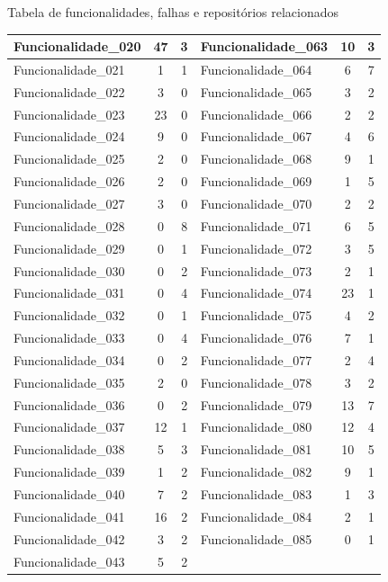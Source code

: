 \documentclass[11.5pt]{article}
\begin{document}
\begin{apendice}{Tabela de funcionalidades, falhas e repositórios relacionados}
\begin{table}[ht]
\begin{tabular}{|l|c|c||l|c|c|}
Funcionalidade\_020 & 47 & 3        & Funcionalidade\_063 & 10 & 3 \\ \hline
Funcionalidade\_021 & 1 & 1         & Funcionalidade\_064 & 6 & 7 \\ \hline
Funcionalidade\_022 & 3 & 0         & Funcionalidade\_065 & 3 & 2 \\ \hline
Funcionalidade\_023 & 23 & 0        & Funcionalidade\_066 & 2 & 2 \\ \hline
Funcionalidade\_024 & 9 & 0         & Funcionalidade\_067 & 4 & 6 \\ \hline
Funcionalidade\_025 & 2 & 0         & Funcionalidade\_068 & 9 & 1 \\ \hline
Funcionalidade\_026 & 2 & 0         & Funcionalidade\_069 & 1 & 5 \\ \hline
Funcionalidade\_027 & 3 & 0         & Funcionalidade\_070 & 2 & 2 \\ \hline
Funcionalidade\_028 & 0 & 8         & Funcionalidade\_071 & 6 & 5 \\ \hline
Funcionalidade\_029 & 0 & 1         & Funcionalidade\_072 & 3 & 5 \\ \hline
Funcionalidade\_030 & 0 & 2         & Funcionalidade\_073 & 2 & 1 \\ \hline
Funcionalidade\_031 & 0 & 4         & Funcionalidade\_074 & 23 & 1 \\ \hline
Funcionalidade\_032 & 0 & 1         & Funcionalidade\_075 & 4 & 2 \\ \hline
Funcionalidade\_033 & 0 & 4         & Funcionalidade\_076 & 7 & 1 \\ \hline
Funcionalidade\_034 & 0 & 2         & Funcionalidade\_077 & 2 & 4 \\ \hline
Funcionalidade\_035 & 2 & 0         & Funcionalidade\_078 & 3 & 2 \\ \hline
Funcionalidade\_036 & 0 & 2         & Funcionalidade\_079 & 13 & 7 \\ \hline
Funcionalidade\_037 & 12 & 1        & Funcionalidade\_080 & 12 & 4 \\ \hline
Funcionalidade\_038 & 5 & 3         & Funcionalidade\_081 & 10 & 5 \\ \hline
Funcionalidade\_039 & 1 & 2         & Funcionalidade\_082 & 9 & 1 \\ \hline
Funcionalidade\_040 & 7 & 2         & Funcionalidade\_083 & 1 & 3 \\ \hline
Funcionalidade\_041 & 16 & 2        & Funcionalidade\_084 & 2 & 1 \\ \hline
Funcionalidade\_042 & 3 & 2         & Funcionalidade\_085 & 0 & 1 \\ \hline
Funcionalidade\_043 & 5 & 2         &                     &   &   \\ \hline
\end{tabular}
\end{table}


\end{apendice}
\end{document}
